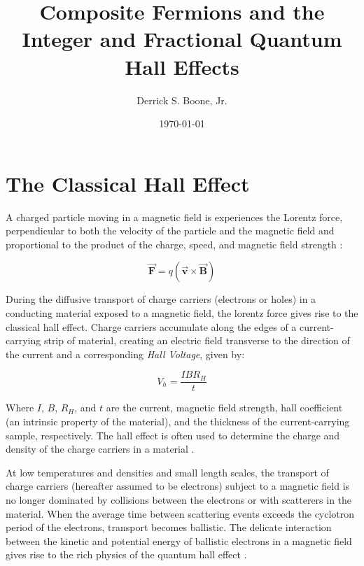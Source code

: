 \documentclass[12pt]{article}
\title{Composite Fermions and the Integer and Fractional Quantum Hall Effects}
\author{Derrick S. Boone, Jr.}
\date{\today}
\theoremstyle{definition}
\theoremstyle{remark}
\begin{document}
\maketitle


\section{The Classical Hall Effect}
A charged particle moving in a magnetic field is experiences the Lorentz force, perpendicular to both the velocity of the particle and the magnetic field and proportional to the product of the charge, speed, and magnetic field strength \cite{grif:electro}:

\begin{equation}
\vec{\mathbf{F}} = q(\vec{\mathbf{v}} \times \vec{\mathbf{B}})
\end{equation}

During the diffusive transport of charge carriers (electrons or holes) in a conducting material exposed to a magnetic field, the lorentz force gives rise to the classical hall effect. Charge carriers accumulate along the edges of a current-carrying strip of material, creating an electric field transverse to the direction of the current and a corresponding \textit{Hall Voltage}, given by:

\begin{equation}
V_{h} = \frac{I B R_{H}}{t}
\end{equation}

Where $I$,  $B$, $R_{H}$, and $t$ are the current, magnetic field strength, hall coefficient (an intrinsic property of the material), and the thickness of the current-carrying sample, respectively. The hall effect is often used to determine the charge and density of the charge carriers in a material \cite{pier:semi}.

At low temperatures and densities and small length scales, the transport of charge carriers (hereafter assumed to be electrons) subject to a magnetic field is no longer dominated by collisions between the electrons or with scatterers in the material. When the average time between scattering events exceeds the cyclotron period of the electrons, transport becomes ballistic. The delicate interaction between the kinetic and potential energy of ballistic electrons in a magnetic field gives rise to the rich physics of the quantum hall effect \cite{been:trans}.
\end{document}
